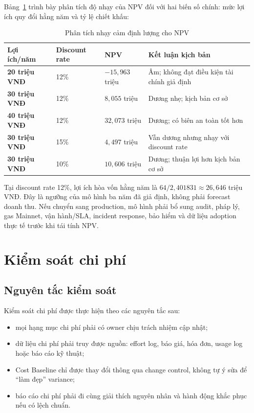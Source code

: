 Bảng~\ref{tab:npv-sensitivity} trình bày phân tích độ nhạy của NPV đối với hai biến số chính: mức lợi ích quy đổi hằng năm và tỷ lệ chiết khấu:

\begin{table}[H]
\centering
\caption{Phân tích nhạy cảm định lượng cho NPV}
\label{tab:npv-sensitivity}
\begin{tabularx}{\textwidth}{| >{\bfseries}p{3cm} | p{3cm} | p{3.2cm} | X |}
\hline
Lợi ích/năm & Discount rate & NPV & Kết luận kịch bản \\
\hline
20 triệu VNĐ & 12\% & $-15{,}963$ triệu & Âm; không đạt điều kiện tài chính giả định \\ \hline
30 triệu VNĐ & 12\% & $8{,}055$ triệu & Dương nhẹ; kịch bản cơ sở \\ \hline
40 triệu VNĐ & 12\% & $32{,}073$ triệu & Dương; có biên an toàn tốt hơn \\ \hline
30 triệu VNĐ & 15\% & $4{,}497$ triệu & Vẫn dương nhưng nhạy với discount rate \\ \hline
30 triệu VNĐ & 10\% & $10{,}606$ triệu & Dương; thuận lợi hơn kịch bản cơ sở \\
\hline
\end{tabularx}
\end{table}

Tại discount rate 12\%, lợi ích hòa vốn hằng năm là $64/2{,}401831\approx26{,}646$ triệu VNĐ. Đây là ngưỡng của mô hình ba năm đã giả định, không phải forecast doanh thu. Nếu chuyển sang production, mô hình phải bổ sung audit, pháp lý, gas Mainnet, vận hành/SLA, incident response, bảo hiểm và dữ liệu adoption thực tế trước khi tái tính NPV.

\section{Kiểm soát chi phí}

\subsection{Nguyên tắc kiểm soát}

Kiểm soát chi phí được thực hiện theo các nguyên tắc sau:

\begin{itemize}
  \item mọi hạng mục chi phí phải có owner chịu trách nhiệm cập nhật;
  \item dữ liệu chi phí phải truy được nguồn: effort log, báo giá, hóa đơn, usage log hoặc báo cáo kỹ thuật;
  \item Cost Baseline chỉ được thay đổi thông qua change control, không tự ý sửa để ``làm đẹp'' variance;
  \item báo cáo chi phí phải đi cùng giải thích nguyên nhân và hành động khắc phục nếu có lệch chuẩn.
\end{itemize}

